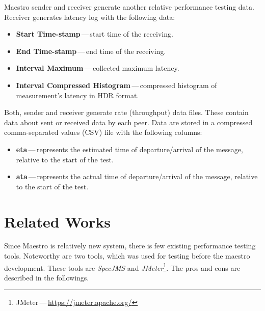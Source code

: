 Maestro sender and receiver generate another relative performance testing data. Receiver generates latency log with the following data:

\begin{itemize}
	\setlength\itemsep{0em}
	\item \textbf{Start Time-stamp}\,---\,start time of the receiving.
	\item \textbf{End Time-stamp}\,---\,end time of the receiving.
	\item \textbf{Interval Maximum}\,---\,collected maximum latency.
	\item \textbf{Interval Compressed Histogram}\,---\,compressed histogram of measurement's latency in HDR\footnotemark{} format.
\end{itemize}

Both, sender and receiver generate rate (throughput) data files. These contain data about sent or received data by each peer. Data are stored in a compressed comma-separated values (CSV) file with the following columns:

\begin{itemize}
	\setlength\itemsep{0em}
	\item \textbf{eta}\,---\,represents the estimated time of departure/arrival of the message, relative to the start of the test.
	\item \textbf{ata}\,---\,represents the actual time of departure/arrival of the message, relative to the start of the test.
\end{itemize}


\section{Related Works}
\label{Related Works}

Since Maestro is relatively new system, there is few existing performance testing tools. Noteworthy are two tools, which was used for testing before the maestro development. These tools are \emph{SpecJMS} \cite{SPECJMS} and \emph{JMeter}\footnote{JMeter\,---\,\url{https://jmeter.apache.org/}}. The pros and cons are described in the followings.

